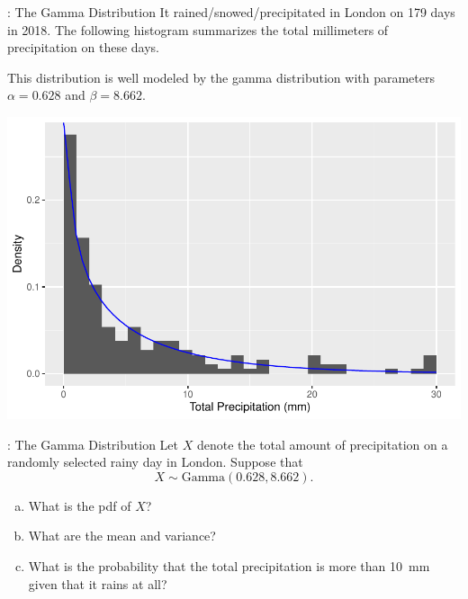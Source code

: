 \begin{frame}
  \begin{block}{\examplectd: The Gamma Distribution}
    It rained/snowed/precipitated in London on 179 days in 2018. The following histogram summarizes the total millimeters of precipitation on these days.

    This distribution is well modeled by the gamma distribution with parameters $\alpha=0.628$ and $\beta=8.662$. 
    
    \begin{center}
      \includegraphics[height=.5\textheight]{figure/gamma1-2}
    \end{center}

  \end{block}
\end{frame}

\begin{frame}
  \begin{block}{\examplectd: The Gamma Distribution}
    Let $X$ denote the total amount of precipitation on a randomly selected rainy day in London. Suppose that
    \[
      X \sim \mbox{Gamma}(0.628,8.662).
    \]

    \begin{enumerate}[a)]
    \item What is the pdf of $X$?
    \item What are the mean and variance?
    \item What is the probability that the total precipitation is more than 10~mm given that it rains at all?
    \end{enumerate}
    
  \end{block}
\end{frame}

